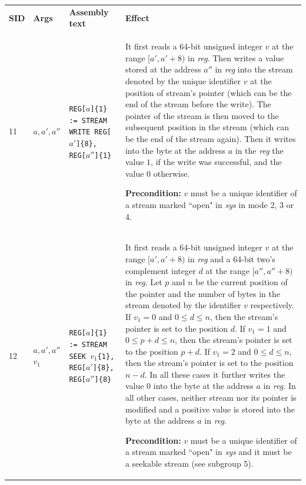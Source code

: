 \documentclass[10pt,twocolumn]{article}
\begin{document}
\begin{table}[!h]
\begin{center}
\def\arraystretch{1.5}
\begin{tabular}{lp{1.2cm}p{5.5cm}p{7.5cm}}
\textbf{SID} & \textbf{Args} & \textbf{Assembly text} & \textbf{Effect}
\\

11 & $ a,a',a'' $ %
& \texttt{REG[}$ a $\texttt{]\{1\} := STREAM WRITE REG[}$ a' $\texttt{]\{8\},
REG[}$ a'' $\texttt{]\{1\}} %
& It first reads a 64-bit unsigned integer $ v $ at the range $ [a',a'+8) $ in
\textit{reg}. Then writes a value stored at the address $ a'' $ in \textit{reg}
into the stream denoted by the unique identifier $ v $ at the position of
stream's pointer (which can be the end of the stream before the write). The
pointer of the stream is then moved to the subsequent position in the stream
(which can be the end of the stream again). Then it writes into the byte at the
address $ a $ in the \textit{reg} the value $ 1 $, if the write was successful,
and the value $ 0 $ otherwise.

\textbf{Precondition:} $ v $ must be a unique identifier of a stream marked
``open" in \textit{sys} in mode 2, 3 or 4. \\

12 & $ a,a',a'' $ $ v_1 $ %
& \texttt{REG[}$ a $\texttt{]\{1\} := STREAM SEEK }$ v_1 $\texttt{\{1\}, REG[}$
a' $\texttt{]\{8\}, REG[}$ a'' $\texttt{]\{8\}} %
& It first reads a 64-bit unsigned integer $ v $ at the range $ [a',a'+8) $ in
\textit{reg} and a 64-bit two's complement integer $ d $ at the range $
[a'',a''+8) $ in \textit{reg}. Let $ p $ and $ n $ be the current position of
the pointer and the number of bytes in the stream denoted by the identifier $ v
$ respectively. If $ v_1 = 0 $ and $ 0 \leq d \leq n $, then the stream's
pointer is set to the position $ d $. If $ v_1 = 1 $ and $ 0 \leq p+d \leq n $,
then the stream's pointer is set to the position $ p+d $. If $ v_1 = 2 $ and $ 0
\leq d \leq n $, then the stream's pointer is set to the position $ n-d $. In
all these cases it further writes the value $ 0 $ into the byte at the address $
a $ in \textit{reg}. In all other cases, neither stream nor its pointer is
modified and a positive value is stored into the byte at the address $ a $ in
\textit{reg}.

\textbf{Precondition:} $ v $ must be a unique identifier of a stream marked
``open" in \textit{sys} and it must be a seekable stream (see subgroup 5). \\


\end{tabular}
\end{center}
\end{table}
\end{document}
